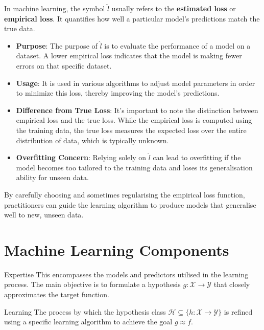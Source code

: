 In machine learning, the symbol $\hat{l}$ usually refers to the \textbf{estimated loss} or \textbf{empirical loss}. It quantifies how well a particular model's predictions match the true data.\\

\begin{itemize}
    \item \textbf{Purpose}: The purpose of $\hat{l}$ is to evaluate the performance of a model on a dataset. A lower empirical loss indicates that the model is making fewer errors on that specific dataset.
    
    \item \textbf{Usage}: It is used in various algorithms to adjust model parameters in order to minimize this loss, thereby improving the model's predictions.
    
    \item \textbf{Difference from True Loss}: It's important to note the distinction between empirical loss and the true loss. While the empirical loss is computed using the training data, the true loss measures the expected loss over the entire distribution of data, which is typically unknown.
    
    \item \textbf{Overfitting Concern}: Relying solely on $\hat{l}$ can lead to overfitting if the model becomes too tailored to the training data and loses its generalisation ability for unseen data.
\end{itemize}

By carefully choosing and sometimes regularising the empirical loss function, practitioners can guide the learning algorithm to produce models that generalise well to new, unseen data.


\section{Machine Learning Components}

\begin{definitionbox}{Expertise}
This encompasses the models and predictors utilised in the learning process. The main objective is to formulate a hypothesis \(g: \mathcal{X} \rightarrow \mathcal{Y}\) that closely approximates the target function.
\end{definitionbox}

\begin{definitionbox}{Learning}
The process by which the hypothesis class \( \mathcal{H} \subseteq \{ h: \mathcal{X} \rightarrow \mathcal{Y} \} \) is refined using a specific learning algorithm to achieve the goal \(g \approx f\).
\end{definitionbox}

